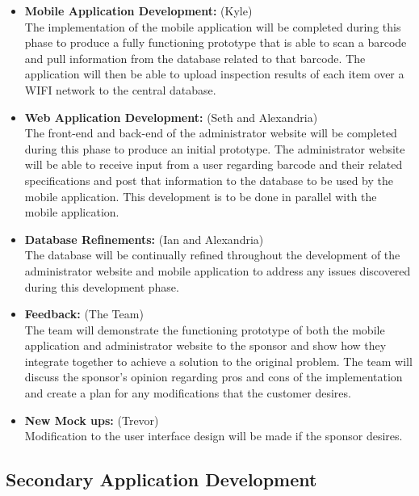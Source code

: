 \documentclass[Letter,11pt]{article}
\begin{document}
		\begin{itemize}
			\item\textbf{Mobile Application Development:} (Kyle)\\
		The implementation of the mobile application will be completed during this phase to produce a fully functioning prototype that is able to scan a barcode and pull information from the database related to that barcode.  The application will then be able to upload inspection results of each item over a WIFI network to the central database.\\		
			\item \textbf{Web Application Development:} (Seth and Alexandria)\\
			The front-end and back-end of the administrator website will be completed during this phase to produce an initial prototype.  The administrator website will be able to receive input from a user regarding barcode and their related specifications and post that information to the database to be used by the mobile application.  This development is to be done in parallel with the mobile application.\\

			\item\textbf{Database Refinements:} (Ian and Alexandria)\\
			The database will be continually refined throughout the development of the administrator website and mobile application to address any issues discovered during this development phase.\\
			
			\item\textbf{Feedback:} (The Team)\\
			The team will demonstrate the functioning prototype of both the mobile application and administrator website to the sponsor and show how they integrate together to achieve a solution to the original problem.  The team will discuss the sponsor’s opinion regarding pros and cons of the implementation and create a plan for any modifications that the customer desires.\\
			
			\item\textbf{New Mock ups:} (Trevor)\\
			Modification to the user interface design will be made if the sponsor desires.

		\end{itemize}
		
	\subsection{Secondary Application Development}\label{dev2}
		
\end{document}
